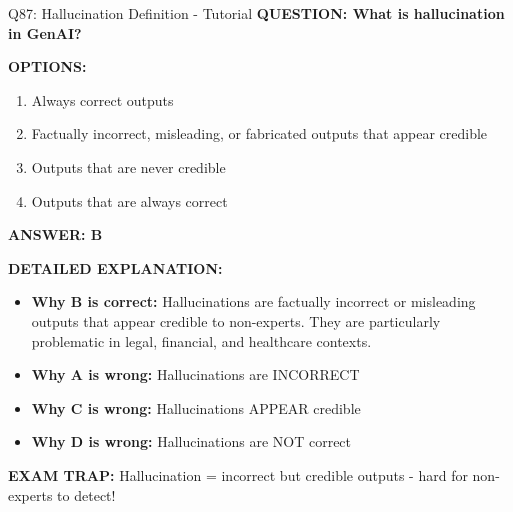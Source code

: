 \documentclass[8pt]{beamer}
\begin{document}
	\begin{frame}{Q87: Hallucination Definition - Tutorial}
		\fontsize{6.5}{7.5}\selectfont
		\textbf{QUESTION: What is hallucination in GenAI?}
		
		\vspace{0.1cm}
		\textbf{OPTIONS:}
		\begin{enumerate}
			\item Always correct outputs
			\item Factually incorrect, misleading, or fabricated outputs that appear credible
			\item Outputs that are never credible
			\item Outputs that are always correct
		\end{enumerate}
		
		\vspace{0.1cm}
		\textcolor{myblue}{\textbf{ANSWER: B}}
		
		\vspace{0.1cm}
		\textbf{DETAILED EXPLANATION:}
		\begin{itemize}
			\item \textbf{Why B is correct:} Hallucinations are factually incorrect or misleading outputs that appear credible to non-experts. They are particularly problematic in legal, financial, and healthcare contexts.
			\item \textbf{Why A is wrong:} Hallucinations are INCORRECT
			\item \textbf{Why C is wrong:} Hallucinations APPEAR credible
			\item \textbf{Why D is wrong:} Hallucinations are NOT correct
		\end{itemize}
		
		\textcolor{myred}{\textbf{EXAM TRAP:}} Hallucination = \textcolor{myblue}{incorrect but credible outputs} - hard for non-experts to detect!
	\end{frame}
	
\end{document}
